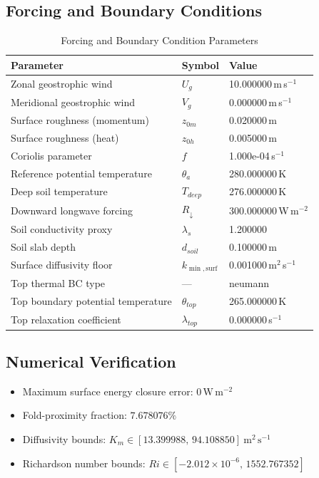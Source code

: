 \subsection{Forcing and Boundary Conditions}
\begin{table}[htbp]
\centering
\caption{Forcing and Boundary Condition Parameters}
\label{tab:scm_parameters_idealized_sbl_idealized_sbl_80x2m_9h_report}
\begin{tabular}{lll}
\hline
{\bfseries Parameter} & {\bfseries Symbol} & {\bfseries Value} \\
\hline
Zonal geostrophic wind & $U_g$ & 10.000000\,m\,s$^{-1}$ \\
Meridional geostrophic wind & $V_g$ & 0.000000\,m\,s$^{-1}$ \\
Surface roughness (momentum) & $z_{0m}$ & 0.020000\,m \\
Surface roughness (heat) & $z_{0h}$ & 0.005000\,m \\
Coriolis parameter & $f$ & 1.000e-04\,s$^{-1}$ \\
Reference potential temperature & $\theta_a$ & 280.000000\,K \\
Deep soil temperature & $T_{deep}$ & 276.000000\,K \\
Downward longwave forcing & $R_{\downarrow}$ & 300.000000\,W\,m$^{-2}$ \\
Soil conductivity proxy & $\lambda_s$ & 1.200000 \\
Soil slab depth & $d_{soil}$ & 0.100000\,m \\
Surface diffusivity floor & $k_{\min,\mathrm{surf}}$ & 0.001000\,m$^2$\,s$^{-1}$ \\
Top thermal BC type & --- & neumann \\
Top boundary potential temperature & $\theta_{top}$ & 265.000000\,K \\
Top relaxation coefficient & $\lambda_{top}$ & 0.000000\,s$^{-1}$ \\
\hline
\end{tabular}
\end{table}

\subsection{Numerical Verification}
\begin{itemize}
  \item Maximum surface energy closure error:
  $0\,\mathrm{W\,m^{-2}}$
  \item Fold-proximity fraction:
  $7.678076\%$
  \item Diffusivity bounds:
  $K_m \in [13.399988,\,94.108850]~\mathrm{m^2\,s^{-1}}$
  \item Richardson number bounds:
  $Ri \in [-2.012 \times 10^{-6},\,1552.767352]$
\end{itemize}

